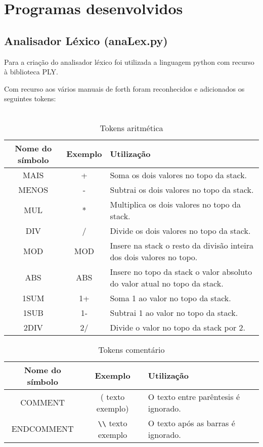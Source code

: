 \documentclass{article}
\begin{document}
\section{Programas desenvolvidos}
\subsection{Analisador Léxico (anaLex.py)}

Para a criação do analisador léxico foi utilizada a linguagem python com recurso à biblioteca PLY.

Com recurso aos vários manuais de forth foram reconhecidos e adicionados os seguintes tokens:\\\\

\begin{table}[h]
    \centering
    \begin{tabular}{|c|c|p{6cm}|}
         \hline
         \textbf{Nome do símbolo}& \textbf{Exemplo} &\textbf{Utilização}\\
         \hline
         MAIS& +   &Soma os dois valores no topo da stack.\\ \hline 
         MENOS& -   &Subtrai os dois valores no topo da stack.\\ \hline 
         MUL& *   &Multiplica os dois valores no topo da stack.\\ \hline 
         DIV& /   &Divide os dois valores no topo da stack.\\ \hline 
         MOD& MOD   &Insere na stack o resto da divisão inteira dos dois valores no topo.\\ \hline 
         ABS& ABS   &Insere no topo da stack o valor absoluto do valor atual no topo da stack.\\ \hline 
         1SUM& 1+   &Soma 1 ao valor no topo da stack.\\ \hline 
         1SUB& 1-   &Subtrai 1 ao valor no topo da stack.\\ \hline
         2DIV& 2/   &Divide o valor no topo da stack por 2.\\
         \hline
    \end{tabular}
    \caption{Tokens aritmética}
    \label{tab:arit}
\end{table}


\begin{table}[h]
    \centering
    \begin{tabular}{|c|c|p{6cm}|}
         \hline
         \textbf{Nome do símbolo}& \textbf{Exemplo} &\textbf{Utilização}\\
         \hline
         COMMENT & ( texto exemplo) & O texto entre parêntesis é ignorado.\\  \hline 
         ENDCOMMENT & \verb|\\| texto exemplo& O texto após as barras é ignorado.\\
         \hline 
    \end{tabular}
    \caption{Tokens comentário}
    \label{tab:arit}
\end{table}
\end{document}
